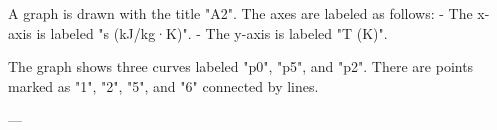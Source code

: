 A graph is drawn with the title "A2". The axes are labeled as follows:  
- The x-axis is labeled "s (kJ/kg·K)".  
- The y-axis is labeled "T (K)".  

The graph shows three curves labeled "p0", "p5", and "p2". There are points marked as "1", "2", "5", and "6" connected by lines.  

---